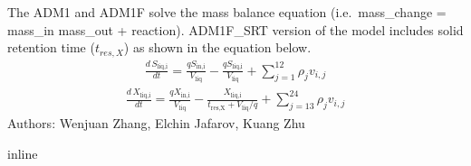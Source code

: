 \documentclass[a4paper,10pt,english]{sphinxmanual}
\begin{document}
\sphinxAtStartPar
The ADM1 and ADM1F solve the mass balance equation (i.e. mass\_change = mass\_in \textendash{} mass\_out + reaction). ADM1F\_SRT version of the model includes solid retention time (\(t_{res,X}\)) as shown in the equation below.
\begin{equation*}
\begin{split}\frac{d\, S_{\text{liq,i}}}{dt} = \frac{qS_{\text{in,i}}}{V_{\text{liq}}} - \frac{qS_{\text{liq,i}} }{V_{\text{liq}}}+ \sum_{j=1}^{12}\rho_{j} v_{i,j}\end{split}
\end{equation*}\begin{equation*}
\begin{split}\frac{d\, X_{\text{liq,i}}}{dt} = \frac{qX_{\text{in,i}}}{V_{\text{liq}}} - \frac{X_{\text{liq,i}}}{t_{\text{res,X}} + V_{\text{liq}}/q} + \sum_{j=13}^{24}\rho_{j} v_{i,j}\end{split}
\end{equation*}
\sphinxAtStartPar
Authors: Wenjuan Zhang, Elchin Jafarov, Kuang Zhu

{
\begin{sphinxVerbatim}[commandchars=\\\{\}]
\llap{\color{nbsphinxin}[1]:\,\hspace{\fboxrule}\hspace{\fboxsep}}
   
   
 
   
   
   
 inline
\end{sphinxVerbatim}
}

{
\begin{sphinxVerbatim}[commandchars=\\\{\}]
\llap{\color{nbsphinxin}[2]:\,\hspace{\fboxrule}\hspace{\fboxsep}}
\end{sphinxVerbatim}
}
\end{document}

